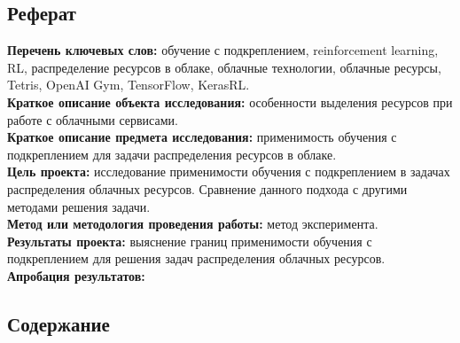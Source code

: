 \documentclass{article}
\begin{document}
\newpage
\begin{center}
\section {Реферат}
\end{center}
\textbf{Перечень ключевых слов: }обучение с подкреплением, reinforcement learning, RL, распределение ресурсов в облаке, облачные технологии, облачные ресурсы, Tetris, OpenAI Gym, TensorFlow, KerasRL.\\
\textbf{Краткое описание объекта исследования:} особенности выделения ресурсов при работе с облачными сервисами.\\
\textbf{Краткое описание предмета исследования:} применимость обучения с подкреплением для задачи распределения ресурсов в облаке.\\
\textbf{Цель проекта:} исследование применимости обучения с подкреплением в задачах распределения облачных ресурсов. Сравнение данного подхода с другими методами решения задачи. \\
\textbf{Метод или методология проведения работы:} метод эксперимента.\\
\textbf{Результаты проекта:} выяснение границ применимости обучения с подкреплением для решения задач распределения облачных ресурсов.\\
\textbf{Апробация результатов:}\\
\newpage
\begin{center}
\section {Содержание}
\tableofcontents
\end{center}
\newpage
\end{document}
